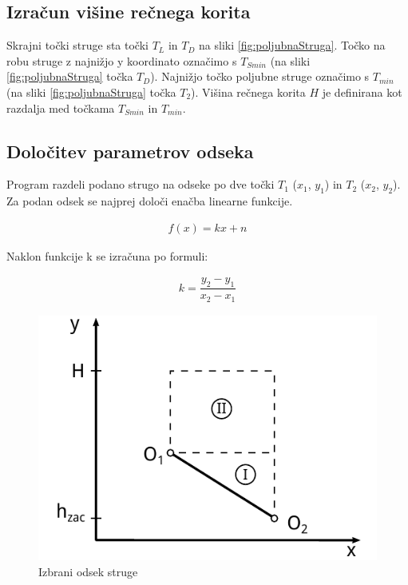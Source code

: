 \subsection{Izračun višine rečnega korita}
Skrajni točki struge sta točki $T_L$ in $T_D$ na sliki \ref{fig:poljubnaStruga}. Točko na robu struge z najnižjo y koordinato označimo s $T_{Smin}$ (na sliki \ref{fig:poljubnaStruga} točka $T_D$). Najnižjo točko poljubne struge označimo s $T_{min}$ (na sliki \ref{fig:poljubnaStruga} točka $T_2$). Višina rečnega korita $H$ je definirana kot razdalja med točkama $T_{Smin}$ in $T_{min}$.




\subsection{Določitev parametrov odseka}

Program razdeli podano strugo na odseke po dve točki $T_1$ ($x_1$, $y_1$) in $T_2$ ($x_2$, $y_2$). Za podan odsek se najprej določi enačba linearne funkcije. 

\begin{ceqn}
\begin{align}
f(x) = kx + n \label{eq:enacba_linearnafunkcija}
\end{align}
\end{ceqn}

Naklon funkcije k se izračuna po formuli: 

\begin{ceqn}
\begin{align}
k = \dfrac{y_2 - y_1}{x_2 - x_1}
\end{align}
\end{ceqn}



\begin{figure}[ht]
	\begin{centering}
		\includegraphics{slike/customChannel/odsek.pdf}
		\caption{Izbrani odsek struge} \label{fig:odsekStruge}
	\end{centering}
\end{figure}




